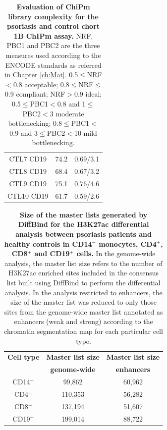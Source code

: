 \begin{table}[htbp]
\begin{tabular}{@{} c c c}
CTL7	CD19  & 74.2	& 0.69/3.1\\
CTL8	CD19  & 68.4  &	0.67/3.2\\
CTL9	CD19  & 75.1  &	0.76/4.6\\
CTL10	CD19  & 61.7  & 0.59/2.6\\
\bottomrule
\end{tabular}
\medskip %
\caption[Evaluation of ChiPm library complexity for the psoriasis and control chort 1B ChIPm assay.]{\textbf{Evaluation of ChiPm library complexity for the psoriasis and control chort 1B ChIPm assay.} NRF, PBC1 and PBC2 are the three measures used according to the ENCODE standards as referred in Chapter \ref{ch:Mat}. 0.5$\leq$NRF$<$0.8 acceptable; 0.8$\leq$NRF$\leq$0.9 compliant; NRF$>$0.9 ideal; 0.5$\leq$PBC1$<$0.8 and 1$\leq$PBC2$<$3 moderate bottlenecking; 0.8$\leq$PBC1$<$0.9 and 3$\leq$PBC2$<$10 mild bottlenecking.}
\label{tab:ChIPm_PS_CTL_library_complexity}
\end{table}
\bigskip %


\begin{table}[htbp]
\centering
\begin{tabular}{@{} c c c}
\toprule
\textbf{Cell type}   & \textbf{Master list size}      & \textbf{Master list size}      \\
                     & \textbf{genome-wide}           & \textbf{enhancers}     \\
\midrule
\midrule
CD14$^+$             & 99,862                  & 60,962                                \\
CD4$^+$              & 110,353                 & 56,282																	\\
CD8$^+$              & 137,194                 & 51,607                                 \\ 
CD19$^+$             & 199,014                 & 88,722                               \\
\bottomrule 
\end{tabular}
\medskip %
\caption[Size of the master lists generated by DiffBind for the H3K27ac differential analysis between psoriasis patients and healthy controls in CD14$^+$ monocytes, CD4$^+$, CD8$^+$ and CD19$^+$ cells.]{\textbf{Size of the master lists generated by DiffBind for the H3K27ac differential analysis between psoriasis patients and healthy controls in CD14$^+$ monocytes, CD4$^+$, CD8$^+$ and CD19$^+$ cells.} In the genome-wide analysis, the master list size refers to the number of H3K27ac enriched sites included in the consensus list built using DiffBind to perform the differential analysis. In the analysis restricted to enhancers, the size of the master list was reduced to only those sites from the genome-wide master list annotated as enhancers (weak and strong) according to the chromatin segmentation map for each particular cell type.}
\label{tab:ChIPm_DiffBind_master_list}
\end{table}
\bigskip %


